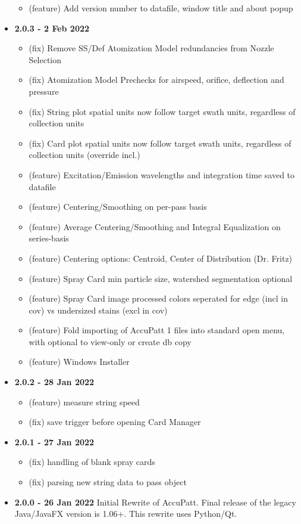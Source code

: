 \documentclass[10pt,letterpaper,titlepage]{article}
\begin{document}
\begin{itemize}
\begin{itemize}
            \item (feature) Add version number to datafile, window title and about popup
        \end{itemize}
        \item \textbf{2.0.3 - 2 Feb 2022}
        \begin{itemize}
            \item (fix) Remove SS/Def Atomization Model redundancies from Nozzle Selection
            \item (fix) Atomization Model Prechecks for airspeed, orifice, deflection and pressure
            \item (fix) String plot spatial units now follow target swath units, regardless of collection units
            \item (fix) Card plot spatial units now follow target swath units, regardless of collection units (override incl.)
            \item (feature) Excitation/Emission wavelengths and integration time saved to datafile
            \item (feature) Centering/Smoothing on per-pass basis
            \item (feature) Average Centering/Smoothing and Integral Equalization on series-basis
            \item (feature) Centering options: Centroid, Center of Distribution (Dr. Fritz)
            \item (feature) Spray Card min particle size, watershed segmentation optional
            \item (feature) Spray Card image processed colors seperated for edge (incl in cov) vs undersized stains (excl in cov)
            \item (feature) Fold importing of AccuPatt 1 files into standard open menu, with optional to view-only or create db copy
            \item (feature) Windows Installer
        \end{itemize}
        \item \textbf{2.0.2 - 28 Jan 2022}
        \begin{itemize}
            \item (feature) measure string speed
            \item (fix) save trigger before opening Card Manager
        \end{itemize}
        \item \textbf{2.0.1 - 27 Jan 2022}
        \begin{itemize}
            \item (fix) handling of blank spray cards
            \item (fix) parsing new string data to pass object
        \end{itemize}
        \item \textbf{2.0.0 - 26 Jan 2022} Initial Rewrite of AccuPatt. Final release of the legacy Java/JavaFX version is 1.06+. This rewrite uses Python/Qt.
    \end{itemize}
\end{document}
